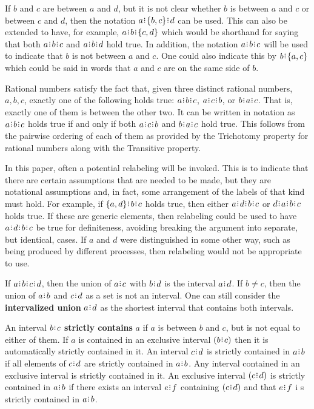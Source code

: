 \documentclass[12pt]{article}
\begin{document}
If $b$ and $c$ are between $a$ and $d$, but it is not clear whether $b$ is between $a$ and $c$ or between $c$ and $d$, then the notation $a\rint \{b,c\}\rint d$ can be used. This can also be extended to have, for example, $a\rint b\rint \{c,d\}$ which would be shorthand for saying that both $a\rint b\rint c$ and $a\rint b\rint d$ hold true. In addition, the notation \sout{$a\rint b\rint c$} will be used to indicate that $b$ is not between $a$ and $c$. One could also indicate this by $b\rint \{a,c\}$ which could be said in words that $a$ and $c$ are on the same side of $b$. 

Rational numbers satisfy the fact that, given three distinct rational numbers, $a, b, c$, exactly one of the following holds true:  $a\rint b\rint c$, $a\rint c\rint b$, or $b\rint a\rint c$. That is, exactly one of them is between the other two. It can be written in notation as $a\rint b\rint c$ holds true if and only if both \sout{$a\rint c\rint b$} and \sout{$b\rint a\rint c$} hold true. This follows from the pairwise ordering of each of them as provided by the Trichotomy property for rational numbers along with the Transitive property. 

In this paper, often a potential relabeling will be invoked. This is to indicate that there are certain assumptions that are needed to be made, but they are notational assumptions and, in fact, some arrangement of the labels of that kind must hold. For example, if $\{a,d\}\rint b\rint c$ holds true, then either $a\rint d\rint b\rint c$ or $d\rint a\rint b\rint c$ holds true. If these are generic elements, then relabeling could be used to have $a\rint d\rint b\rint c$  be  true for definiteness, avoiding breaking the argument into separate, but identical, cases. If $a$ and $d$ were distinguished in some other way, such as being produced by different processes, then relabeling would not be appropriate to use. 

If $a\rint b\rint c\rint d$, then the union of $a\rint c$ with $b\rint d$ is the interval $a\rint d$. If $b \neq c$, then the union of $a\rint b$ and $c\rint d$ as a set is not an interval. One can still consider the \textbf{intervalized union} $a\rint d$ as the shortest interval that contains both intervals. 

An interval $b\rint c$ \textbf{strictly contains} $a$ if $a$ is between $b$ and $c$, but is not equal to either of them. If $a$ is contained in an exclusive interval $(b\rint c)$ then it is automatically strictly contained in it. An interval $c\rint d$ is strictly contained in $a\rint b$ if all elements of $c\rint d$ are strictly contained in $a\rint b$. Any interval contained in an exclusive interval is strictly contained in it. An exclusive interval $(c\rint d)$ is strictly contained in $a\rint b$ if there exists an interval $e\rint f$ containing $(c\rint d)$ and that $e\rint f$ i s strictly contained in $a\rint b$. 
\end{document}
